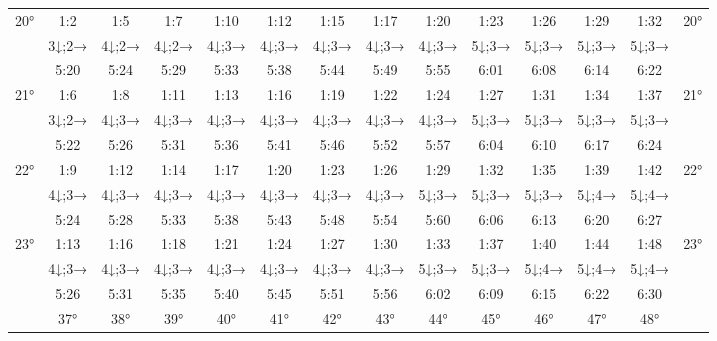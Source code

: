 \begin{scriptsize}
\begin{tabular}{c || c | c | c | c | c | c | c | c | c | c | c | c || c}
		\multirow{3}{*}{20°}&1:2&1:5&1:7&1:10&1:12&1:15&1:17&1:20&1:23&1:26&1:29&1:32&\multirow{3}{*}{20°}\\ \space&3↓;2→&4↓;2→&4↓;2→&4↓;3→&4↓;3→&4↓;3→&4↓;3→&4↓;3→&5↓;3→&5↓;3→&5↓;3→&5↓;3→&\space\\&5:20&5:24&5:29&5:33&5:38&5:44&5:49&5:55&6:01&6:08&6:14&6:22&\space\\\hline
		\multirow{3}{*}{21°}&1:6&1:8&1:11&1:13&1:16&1:19&1:22&1:24&1:27&1:31&1:34&1:37&\multirow{3}{*}{21°}\\ \space&3↓;2→&4↓;3→&4↓;3→&4↓;3→&4↓;3→&4↓;3→&4↓;3→&4↓;3→&5↓;3→&5↓;3→&5↓;3→&5↓;3→&\space\\&5:22&5:26&5:31&5:36&5:41&5:46&5:52&5:57&6:04&6:10&6:17&6:24&\space\\\hline
		\multirow{3}{*}{22°}&1:9&1:12&1:14&1:17&1:20&1:23&1:26&1:29&1:32&1:35&1:39&1:42&\multirow{3}{*}{22°}\\ \space&4↓;3→&4↓;3→&4↓;3→&4↓;3→&4↓;3→&4↓;3→&4↓;3→&5↓;3→&5↓;3→&5↓;3→&5↓;4→&5↓;4→&\space\\&5:24&5:28&5:33&5:38&5:43&5:48&5:54&5:60&6:06&6:13&6:20&6:27&\space\\\hline
		\multirow{3}{*}{23°}&1:13&1:16&1:18&1:21&1:24&1:27&1:30&1:33&1:37&1:40&1:44&1:48&\multirow{3}{*}{23°}\\ \space&4↓;3→&4↓;3→&4↓;3→&4↓;3→&4↓;3→&4↓;3→&4↓;3→&5↓;3→&5↓;3→&5↓;4→&5↓;4→&5↓;4→&\space\\&5:26&5:31&5:35&5:40&5:45&5:51&5:56&6:02&6:09&6:15&6:22&6:30&\space\\\hline
		\hline\space &37°&38°&39°&40°&41°&42°&43°&44°&45°&46°&47°&48°
\end{tabular}\end{scriptsize}

